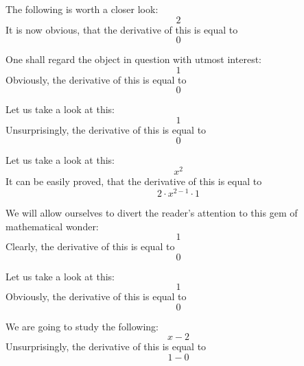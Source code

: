 \documentclass{article}
\begin{document}
The following is worth a closer look:
\begin{equation}
2 
\end{equation}
It is now obvious, that the derivative of this is equal to
\begin{equation}
0 
\end{equation}

One shall regard the object in question with utmost interest:
\begin{equation}
1 
\end{equation}
Obviously, the derivative of this is equal to
\begin{equation}
0 
\end{equation}

Let us take a look at this:
\begin{equation}
1 
\end{equation}
Unsurprisingly, the derivative of this is equal to
\begin{equation}
0 
\end{equation}

Let us take a look at this:
\begin{equation}
x ^{2 } 
\end{equation}
It can be easily proved, that the derivative of this is equal to
\begin{equation}
2 \cdot x ^{2 - 1 } \cdot 1 
\end{equation}

We will allow ourselves to divert the reader's attention to this gem of mathematical wonder:
\begin{equation}
1 
\end{equation}
Clearly, the derivative of this is equal to
\begin{equation}
0 
\end{equation}

Let us take a look at this:
\begin{equation}
1 
\end{equation}
Obviously, the derivative of this is equal to
\begin{equation}
0 
\end{equation}

We are going to study the following:
\begin{equation}
x - 2 
\end{equation}
Unsurprisingly, the derivative of this is equal to
\begin{equation}
1 - 0 
\end{equation}
\end{document}
